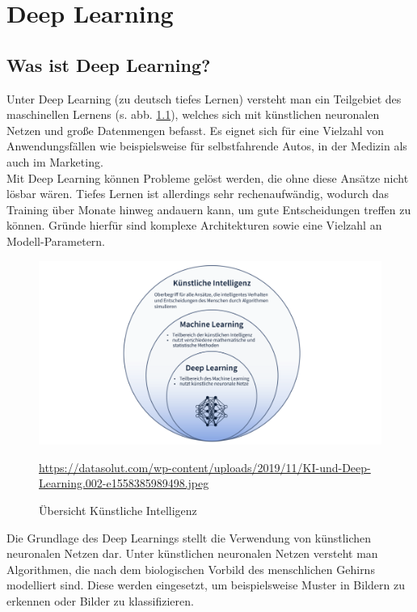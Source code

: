 \chapter{Deep Learning}

\section{Was ist Deep Learning?}

Unter Deep Learning (zu deutsch tiefes Lernen) versteht man ein Teilgebiet des maschinellen Lernens (\acs{s.} \acs{abb.} \ref{overview-ki}), welches sich mit künstlichen neuronalen Netzen und große Datenmengen befasst. Es eignet sich für eine Vielzahl von Anwendungsfällen wie beispielsweise für selbstfahrende Autos, in der Medizin als auch im Marketing. \cite{datasolut2}\\

Mit Deep Learning können Probleme gelöst werden, die ohne diese Ansätze nicht lösbar wären. Tiefes Lernen ist allerdings sehr rechenaufwändig, wodurch das Training über Monate hinweg andauern kann, um gute Entscheidungen treffen zu können. Gründe hierfür sind komplexe Architekturen sowie eine Vielzahl an Modell-Parametern. \cite{datasolut2} \\

\begin{figure}[H]
	\centering
	\includegraphics[width=\textwidth]{kapitel3/images/KI_Uebersicht.png}
	\caption{Übersicht Künstliche Intelligenz}
	\label{overview-ki}
	\vspace{0.2cm}
	\quelle\url{https://datasolut.com/wp-content/uploads/2019/11/KI-und-Deep-Learning.002-e1558385989498.jpeg}
\end{figure}

Die Grundlage des Deep Learnings stellt die Verwendung von künstlichen neuronalen Netzen dar. Unter künstlichen neuronalen Netzen versteht man Algorithmen, die nach dem biologischen Vorbild des menschlichen Gehirns modelliert sind. Diese werden eingesetzt, um beispielsweise Muster in Bildern zu erkennen oder Bilder zu klassifizieren. \cite{datasolut2}\\

